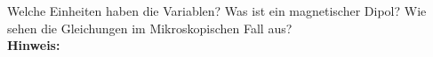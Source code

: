 \begin{question}[section=2,subsection=22,name={Polerisation und Magnetisierung},difficulty=4,type=mdl,tags={}]
	Welche Einheiten haben die Variablen? Was ist ein magnetischer Dipol? Wie sehen die Gleichungen im Mikroskopischen Fall aus?
	\\ \textbf{Hinweis:}\\
	
\end{question}
\begin{solution}
	
\end{solution}